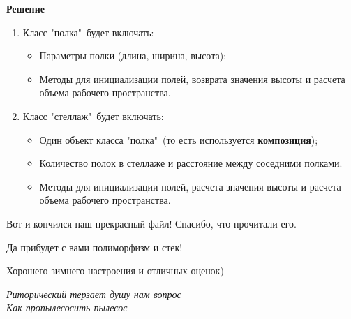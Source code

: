 {\bf Решение}

\begin{enumerate}
\item Класс "полка"\ будет включать:
\begin{itemize}
    \item Параметры полки (длина, ширина, высота);
    \item Методы для инициализации полей, возврата значения высоты и расчета объема рабочего пространства. 
\end{itemize}

\item Класс "стеллаж"\ будет включать:
\begin{itemize} 
    \item Один объект класса "полка"\ (то есть используется {\bf композиция});
    \item Количество полок в стеллаже и расстояние между соседними полками. 
    \item Методы для инициализации полей, расчета значения высоты и расчета объема рабочего пространства. 
\end{itemize}
\end{enumerate}

{}



{}



\vspace*{250pt}
\noindent\makebox[\linewidth]{\rule{\paperwidth}{0.4pt}}
\vspace*{20pt}
{\begin{myquote2}
\begin{center}
    \bf \begin{small}{
    Вот и кончился наш прекрасный файл! Спасибо, что прочитали его.

    Да прибудет с вами полиморфизм и стек!

    Хорошего зимнего настроения и отличных оценок)

}\end{small}\end{center}
\begin{flushright}
    \textit{Риторический терзает душу нам вопрос\\
    Как пропылесосить пылесос}
    \end{flushright}
\end{myquote2}}

